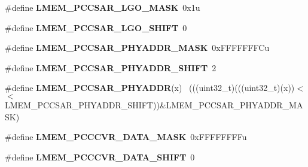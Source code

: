 \begin{DoxyCompactItemize}
\item 
\hypertarget{group___l_m_e_m___register___masks_ga27d8677a0540067250356ef3d533573e}{}\#define {\bfseries L\+M\+E\+M\+\_\+\+P\+C\+C\+S\+A\+R\+\_\+\+L\+G\+O\+\_\+\+M\+A\+S\+K}~0x1u\label{group___l_m_e_m___register___masks_ga27d8677a0540067250356ef3d533573e}

\item 
\hypertarget{group___l_m_e_m___register___masks_ga38bbc8c48540a6ca6231d451bb796aa4}{}\#define {\bfseries L\+M\+E\+M\+\_\+\+P\+C\+C\+S\+A\+R\+\_\+\+L\+G\+O\+\_\+\+S\+H\+I\+F\+T}~0\label{group___l_m_e_m___register___masks_ga38bbc8c48540a6ca6231d451bb796aa4}

\item 
\hypertarget{group___l_m_e_m___register___masks_gad35a61199545a55a36a689589700f5a9}{}\#define {\bfseries L\+M\+E\+M\+\_\+\+P\+C\+C\+S\+A\+R\+\_\+\+P\+H\+Y\+A\+D\+D\+R\+\_\+\+M\+A\+S\+K}~0x\+F\+F\+F\+F\+F\+F\+F\+Cu\label{group___l_m_e_m___register___masks_gad35a61199545a55a36a689589700f5a9}

\item 
\hypertarget{group___l_m_e_m___register___masks_gaf1c48aa4bf597929a1aba87eed8bb94f}{}\#define {\bfseries L\+M\+E\+M\+\_\+\+P\+C\+C\+S\+A\+R\+\_\+\+P\+H\+Y\+A\+D\+D\+R\+\_\+\+S\+H\+I\+F\+T}~2\label{group___l_m_e_m___register___masks_gaf1c48aa4bf597929a1aba87eed8bb94f}

\item 
\hypertarget{group___l_m_e_m___register___masks_ga6c2ba13311439a95965af324a10afafa}{}\#define {\bfseries L\+M\+E\+M\+\_\+\+P\+C\+C\+S\+A\+R\+\_\+\+P\+H\+Y\+A\+D\+D\+R}(x)                                  ~(((uint32\+\_\+t)(((uint32\+\_\+t)(x))$<$$<$L\+M\+E\+M\+\_\+\+P\+C\+C\+S\+A\+R\+\_\+\+P\+H\+Y\+A\+D\+D\+R\+\_\+\+S\+H\+I\+F\+T))\&L\+M\+E\+M\+\_\+\+P\+C\+C\+S\+A\+R\+\_\+\+P\+H\+Y\+A\+D\+D\+R\+\_\+\+M\+A\+S\+K)\label{group___l_m_e_m___register___masks_ga6c2ba13311439a95965af324a10afafa}

\item 
\hypertarget{group___l_m_e_m___register___masks_ga67dc4053f672f8acbfbd6c65e55420af}{}\#define {\bfseries L\+M\+E\+M\+\_\+\+P\+C\+C\+C\+V\+R\+\_\+\+D\+A\+T\+A\+\_\+\+M\+A\+S\+K}~0x\+F\+F\+F\+F\+F\+F\+F\+Fu\label{group___l_m_e_m___register___masks_ga67dc4053f672f8acbfbd6c65e55420af}

\item 
\hypertarget{group___l_m_e_m___register___masks_gaaf86689764e9b81196b6d83c16e99ae2}{}\#define {\bfseries L\+M\+E\+M\+\_\+\+P\+C\+C\+C\+V\+R\+\_\+\+D\+A\+T\+A\+\_\+\+S\+H\+I\+F\+T}~0\label{group___l_m_e_m___register___masks_gaaf86689764e9b81196b6d83c16e99ae2}


\end{DoxyCompactItemize}
